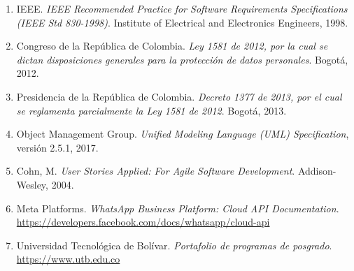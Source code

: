 \documentclass[12pt,a4paper]{report}
\begin{document}
\begin{enumerate}[itemsep=3pt]
    \item IEEE. \textit{IEEE Recommended Practice for Software Requirements Specifications
    (IEEE Std 830-1998)}. Institute of Electrical and Electronics Engineers, 1998.
    \item Congreso de la República de Colombia. \textit{Ley 1581 de 2012, por la cual se dictan
    disposiciones generales para la protección de datos personales}. Bogotá, 2012.
    \item Presidencia de la República de Colombia. \textit{Decreto 1377 de 2013, por el cual se
    reglamenta parcialmente la Ley 1581 de 2012}. Bogotá, 2013.
    \item Object Management Group. \textit{Unified Modeling Language (UML) Specification},
    versión 2.5.1, 2017.
    \item Cohn, M. \textit{User Stories Applied: For Agile Software Development}.
    Addison-Wesley, 2004.
    \item Meta Platforms. \textit{WhatsApp Business Platform: Cloud API Documentation}.
    \url{https://developers.facebook.com/docs/whatsapp/cloud-api}
    \item Universidad Tecnológica de Bolívar. \textit{Portafolio de programas de posgrado}.
    \url{https://www.utb.edu.co}
\end{enumerate}
\end{document}
